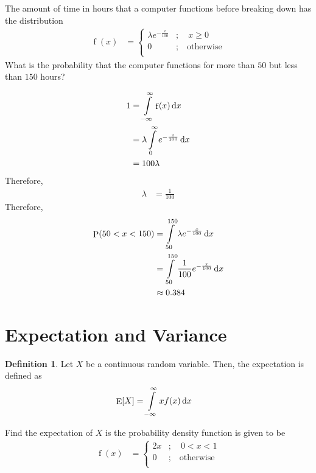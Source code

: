 \documentclass[titlepage, fleqn, a4paper, 12pt, twoside]{article}
\theoremstyle{definition}
\newtheorem{definition}{Definition}
\theoremstyle{theorem}
\DeclareMathOperator{\prob}{\mathrm{P}}
\DeclareMathOperator{\expct}{\mathrm{E}}
\DeclareMathOperator{\pdf}{\mathrm{f}}
\begin{document}
\begin{question}
	The amount of time in hours that a computer functions before breaking down has the distribution
	\begin{align*}
		\pdf(x) &=
			\begin{cases}
				\lambda e^{-\frac{x}{100}} & ;\quad x \ge 0          \\
				0                          & ;\quad \text{otherwise} \\
			\end{cases}
	\end{align*}
	What is the probability that the computer functions for more than $50$ but less than $150$ hours?
\end{question}

\begin{solution}
	\begin{align*}
		1 & = \int\limits_{-\infty}^{\infty} \pdf(x) \dif x              \\
                  & = \lambda \int\limits_{0}^{\infty} e^{-\frac{x}{100}} \dif x \\
                  & = 100 \lambda
	\end{align*}
	Therefore,
	\begin{align*}
		\lambda & = \frac{1}{100}
	\end{align*}
	Therefore,
	\begin{align*}
		\prob(50 < x < 150) & = \int\limits_{50}^{150} \lambda e^{-\frac{x}{100}} \dif x       \\
                                    & = \int\limits_{50}^{150} \frac{1}{100} e^{-\frac{x}{100}} \dif x \\
                                    & \approx 0.384
	\end{align*}
\end{solution}

\section{Expectation and Variance}

\begin{definition}
	Let $X$ be a continuous random variable.
	Then, the expectation is defined as
	\begin{align*}
		\expct[X] &= \int\limits_{-\infty}^{\infty} x f(x) \dif x
	\end{align*}
\end{definition}

\begin{question}
	Find the expectation of $X$ is the probability density function is given to be
	\begin{align*}
		\pdf(x) &=
			\begin{cases}
				2 x &;\quad 0 < x < 1\\
				0 &;\quad \text{otherwise}\\
			\end{cases}
	\end{align*}
\end{question}
\end{document}
